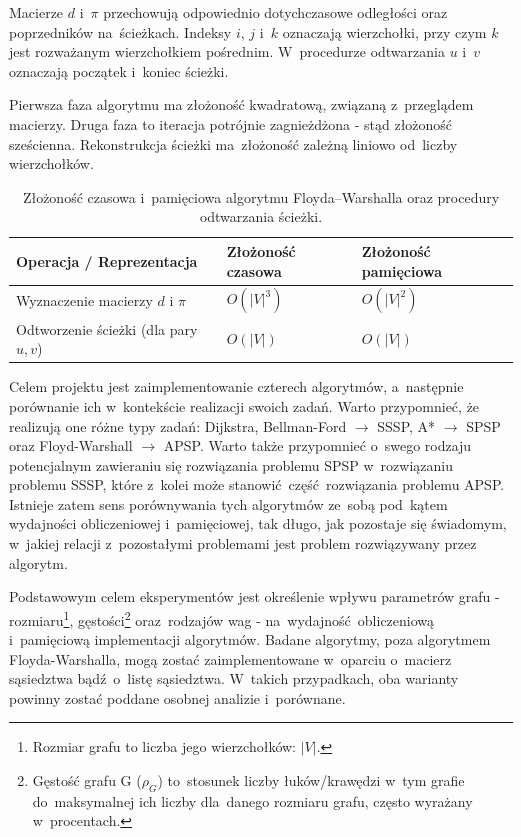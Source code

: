 \documentclass[11pt,a4paper,oneside]{report}
\begin{document}
Macierze $d$ i~$\pi$ przechowują odpowiednio dotychczasowe odległości oraz poprzedników na~ścieżkach. Indeksy $i$, $j$ i~$k$ oznaczają wierzchołki, przy czym $k$ jest rozważanym wierzchołkiem pośrednim. W~procedurze odtwarzania $u$ i~$v$ oznaczają początek i~koniec ścieżki.

Pierwsza faza algorytmu ma złożoność kwadratową, związaną z~przeglądem macierzy. Druga faza to iteracja potrójnie zagnieżdżona - stąd złożoność sześcienna. Rekonstrukcja ścieżki ma~złożoność zależną liniowo od~liczby wierzchołków.

\begin{table}[H]
  \centering
  \small
  \renewcommand{\arraystretch}{1.25}
  \begin{tabularx}{0.9\textwidth}{@{}lXX@{}}
    \toprule
    \textbf{Operacja / Reprezentacja} & \textbf{Złożoność czasowa} & \textbf{Złożoność pamięciowa} \\
    \midrule
    Wyznaczenie macierzy $d$ i $\pi$ & $O(|V|^3)$ & $O(|V|^2)$ \\
    Odtworzenie ścieżki (dla pary $u,v$) & $O(|V|)$ & $O(|V|)$ \\
    \bottomrule
  \end{tabularx}
  \caption{Złożoność czasowa i~pamięciowa algorytmu Floyda--Warshalla oraz procedury odtwarzania ścieżki.}
  \label{tab:zlozonosc-floyda-warshalla}
\end{table}


Celem projektu jest zaimplementowanie czterech algorytmów, a~następnie porównanie ich w~kontekście realizacji swoich zadań. Warto przypomnieć, że realizują one różne typy zadań: Dijkstra, Bellman-Ford $\rightarrow$ SSSP, A* $\rightarrow$ SPSP oraz Floyd-Warshall $\rightarrow$ APSP. Warto także przypomnieć o~swego rodzaju potencjalnym \glqq zawieraniu się\grqq{} rozwiązania problemu SPSP w~rozwiązaniu problemu SSSP, które z~kolei może stanowić część rozwiązania problemu APSP. Istnieje zatem sens porównywania tych algorytmów ze~sobą pod~kątem wydajności obliczeniowej i~pamięciowej, tak długo, jak pozostaje się świadomym, w~jakiej relacji z~pozostałymi problemami jest problem rozwiązywany przez algorytm.

Podstawowym celem eksperymentów jest określenie wpływu parametrów grafu - rozmiaru\footnote{Rozmiar grafu to liczba jego wierzchołków: $|V|$.}, gęstości\footnote{Gęstość grafu G ($\rho_G$) to~stosunek liczby łuków/krawędzi w~tym grafie do~maksymalnej ich liczby dla~danego rozmiaru grafu, często wyrażany w~procentach.} oraz~rodzajów wag - na~wydajność obliczeniową i~pamięciową implementacji algorytmów. Badane algorytmy, poza algorytmem Floyda-Warshalla, mogą zostać zaimplementowane w~oparciu o~macierz sąsiedztwa bądź~o~listę sąsiedztwa. W~takich przypadkach, oba warianty powinny zostać poddane osobnej analizie i~porównane.
\end{document}
